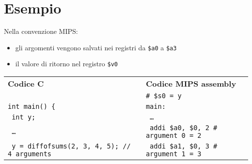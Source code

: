 \documentclass[../main.tex]{subfiles}
\begin{document}
\section*{Esempio}
Nella convenzione MIPS:
\begin{itemize}
    \item gli argomenti vengono salvati nei registri
          da \texttt{\$a0} a \texttt{\$a3}
    \item il valore di ritorno nel registro \texttt{\$v0}
\end{itemize}
\begin{table}[h!]
    \centering

    \begin{tabular}{ l l }
        \textbf{Codice C} & \textbf{Codice MIPS assembly} \\
        & \texttt{\# \$s0 = y} \\
        \texttt{int main() \{} & \texttt{main:} \\
        \texttt{\hspace*{0cm} \hspace*{0cm} \hspace*{0cm} \hspace*{0cm} int y;} & \texttt{\hspace*{0cm} \hspace*{0cm} \hspace*{0cm} \hspace*{0cm} \dots} \\
        \texttt{\hspace*{0cm} \hspace*{0cm} \hspace*{0cm} \hspace*{0cm} \dots} & \texttt{\hspace*{0cm} \hspace*{0cm} \hspace*{0cm} \hspace*{0cm} addi \$a0, \$0, 2 \hspace*{0cm} \hspace*{0cm} \hspace*{0cm} \# argument 0 = 2} \\
        \texttt{\hspace*{0cm} \hspace*{0cm} \hspace*{0cm} \hspace*{0cm} y = diffofsums(2, 3, 4, 5); // 4 arguments} & \texttt{\hspace*{0cm} \hspace*{0cm} \hspace*{0cm} \hspace*{0cm} addi \$a1, \$0, 3 \hspace*{0cm} \hspace*{0cm} \hspace*{0cm} \# argument 1 = 3} \\

\end{tabular}
\end{table}
\end{document}
